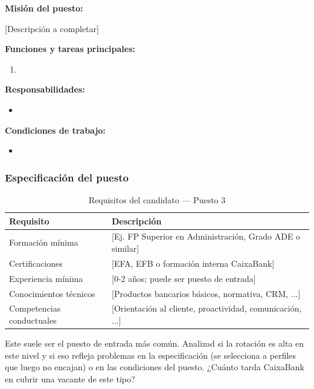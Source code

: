 \textbf{Misión del puesto:}

[Descripción a completar]

\textbf{Funciones y tareas principales:}
\begin{enumerate}
  \item [...]
\end{enumerate}

\textbf{Responsabilidades:}
\begin{itemize}
  \item [...]
\end{itemize}

\textbf{Condiciones de trabajo:}
\begin{itemize}
  \item [...]
\end{itemize}

\subsubsection{Especificación del puesto}

\begin{table}[H]
  \centering
  \small
  \caption{Requisitos del candidato — Puesto 3}
  \begin{tabularx}{\textwidth}{lX}
    \toprule
    \textbf{Requisito}       & \textbf{Descripción} \\
    \midrule
    Formación mínima         & [Ej. FP Superior en Administración, Grado ADE o similar] \\
    Certificaciones          & [EFA, EFB o formación interna CaixaBank] \\
    Experiencia mínima       & [0-2 años; puede ser puesto de entrada] \\
    Conocimientos técnicos   & [Productos bancarios básicos, normativa, CRM, ...] \\
    Competencias conductuales & [Orientación al cliente, proactividad, comunicación, ...] \\
    \bottomrule
  \end{tabularx}
\end{table}

\begin{notaequipo}
  Este suele ser el puesto de entrada más común. Analizad si la rotación
  es alta en este nivel y si eso refleja problemas en la especificación
  (se selecciona a perfiles que luego no encajan) o en las condiciones del puesto.
  ¿Cuánto tarda CaixaBank en cubrir una vacante de este tipo?
\end{notaequipo}
